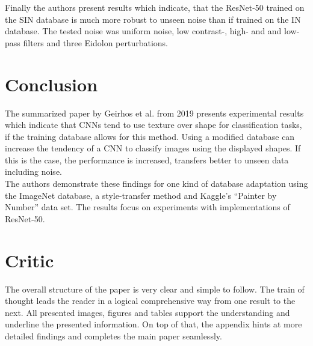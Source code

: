 \documentclass[runningheads,a4paper]{llncs}
\begin{document}
Finally the authors present results which indicate, that the ResNet-50 trained on the SIN database is much more robust to unseen noise than if trained on the IN database. The tested noise was uniform noise, low contrast-, high- and and low-pass filters and three Eidolon perturbations. %

\section{Conclusion}
The summarized paper by Geirhos et al. from 2019 presents experimental results which indicate that CNNs tend to use texture over shape for classification tasks, if the training database allows for this method. Using a modified database can increase the tendency of a CNN to classify images using the displayed shapes. If this is the case, the performance is increased, transfers better to unseen data including noise.\\

The authors demonstrate these findings for one kind of database adaptation using the ImageNet database, a style-transfer method and Kaggle's ``Painter by Number'' data set.%
The results focus on experiments with implementations of ResNet-50.

\section{Critic}
The overall structure of the paper is very clear and simple to follow. The train of thought leads the reader in a logical comprehensive way from one result to the next. All presented images, figures and tables support the understanding and underline the presented information.
On top of that, the appendix hints at more detailed findings and completes the main paper seamlessly.\\
\end{document}
